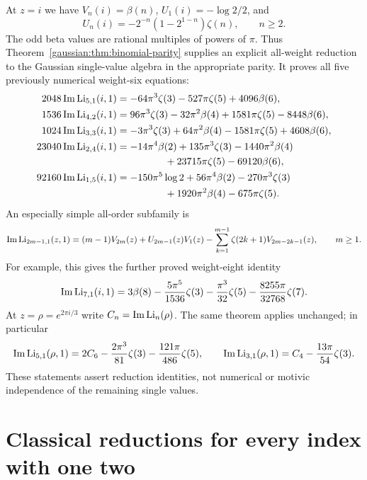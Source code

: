 At $z=i$ we have $V_n(i)=\beta(n)$,
$U_1(i)=-\log2/2$, and
\[
 U_n(i)=-2^{-n}(1-2^{1-n})\zeta(n),\qquad n\ge2.
\]
The odd beta values are rational multiples of powers of $\pi$.
Thus Theorem~\ref{gaussian:thm:binomial-parity} supplies an explicit all-weight
reduction to the Gaussian single-value algebra in the appropriate parity.
It proves all five previously numerical weight-six equations:
\begin{align}
\label{gauss:eq:g51}
2048\operatorname{Im}\Li_{5,1}(i,1)
 &=-64\pi^3\zeta(3)-527\pi\zeta(5)+4096\beta(6),\\
\label{gauss:eq:g42}
1536\operatorname{Im}\Li_{4,2}(i,1)
 &=96\pi^3\zeta(3)-32\pi^2\beta(4)+1581\pi\zeta(5)-8448\beta(6),\\
\label{gauss:eq:g33}
1024\operatorname{Im}\Li_{3,3}(i,1)
 &=-3\pi^3\zeta(3)+64\pi^2\beta(4)-1581\pi\zeta(5)+4608\beta(6),\\
\label{gauss:eq:g24}
23040\operatorname{Im}\Li_{2,4}(i,1)
 &=-14\pi^4\beta(2)+135\pi^3\zeta(3)-1440\pi^2\beta(4)\\
 &\hspace{17mm}+23715\pi\zeta(5)-69120\beta(6),\\
\label{gauss:eq:g15}
92160\operatorname{Im}\Li_{1,5}(i,1)
 &=-150\pi^5\log2+56\pi^4\beta(2)-270\pi^3\zeta(3)\\
 &\hspace{17mm}+1920\pi^2\beta(4)-675\pi\zeta(5).
\end{align}
An especially simple all-order subfamily is
\begin{equation}\label{gaussian:eq:leading-index-family}
 \operatorname{Im}\operatorname{Li}_{2m-1,1}(z,1)
  =(m-1)V_{2m}(z)+U_{2m-1}(z)V_1(z)
   -\sum_{k=1}^{m-1}\zeta(2k+1)V_{2m-2k-1}(z),
 \qquad m\ge1.
\end{equation}
For example, this gives the further proved weight-eight identity
\[
 \operatorname{Im}\operatorname{Li}_{7,1}(i,1)
 =3\beta(8)-\frac{5\pi^5}{1536}\zeta(3)
             -\frac{\pi^3}{32}\zeta(5)
             -\frac{8255\pi}{32768}\zeta(7).
\]
At $z=\rho=e^{2\pi i/3}$ write $C_n=\operatorname{Im}\operatorname{Li}_n(\rho)$.
The same theorem applies unchanged; in particular
\[
 \operatorname{Im}\operatorname{Li}_{5,1}(\rho,1)
 =2C_6-\frac{2\pi^3}{81}\zeta(3)-\frac{121\pi}{486}\zeta(5),
\qquad
 \operatorname{Im}\operatorname{Li}_{3,1}(\rho,1)
 =C_4-\frac{13\pi}{54}\zeta(3).
\]
These statements assert reduction identities, not numerical or motivic
independence of the remaining single values.

\section{Classical reductions for every index with one two}
\label{gaussian:sec:one-two}

